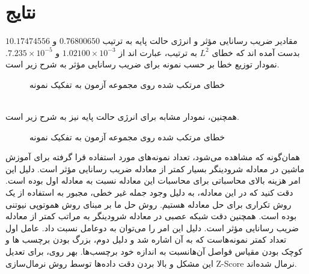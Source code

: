 \section*{نتایج}
مقادیر ضریب رسانایی مؤثر و انرژی حالت پایه به ترتیب $0.76800650$ و $10.17474556$ بدست آمده اند که خطای $L^2$ به ترتیب، عبارت اند از $1.02100 \times 10^{-3}$ و $7.235 \times 10^{-5}$. نمودار توزیع خطا بر حسب نمونه برای ضریب رسانایی مؤثر به شرح زیر است.
\begin{figure}[h!]
	{
		\centering
		\def\svgwidth{\columnwidth}
		\scalebox{.5}{}
		\caption{خطای مرتکب شده  روی مجموعه آزمون به تفکیک نمونه}
		\label{fig:ECIM_error_bar}
	}
\end{figure}
\\همچنین، نمودار مشابه برای انرژی حالت پایه نیز به شرح زیر است.
\begin{figure}[h!]
	{
		\centering
		\def\svgwidth{\columnwidth}
		\scalebox{.5}{}
		\caption{خطای مرتکب شده  روی مجموعه آزمون به تفکیک نمونه}
		\label{fig:NLSE_error_bar}
	}
\end{figure}
همان‌گونه که مشاهده می‌شود، تعداد نمونه‌های مورد استفاده قرا گرفته برای آموزش ماشین در معادله شرودینگر بسیار کمتر از معادله ضریب رسانایی مؤثر است. دلیل این امر هزینه بالای محاسباتی برای محاسبات این معادله نسبت به معادله اول بوده است. دقت کنید که در این معادله، به دلیل وجود جمله غیر خطی، مجبور به استفاده از یک روش تکراری برای حل معادله هستیم. روش حل ما بر مبنای روش هموتوپی نیوتنی بوده است. همچنین دقت شبکه عصبی در معادله شرودینگر به مراتب کمتر از معادله ضریب رسانایی مؤثر است. دلیل این امر را می‌توان به دوعامل نسبت داد. عامل اول تعداد کمتر نمونه‌هاست که به آن اشاره شد و دلیل دوم، بزرگ بودن برچسب ها و کوچک بودن مقیاس فواصل آن‌هانسبت به اندازه خود برچسب‌ها. بهر روی، برای تعدیل این مشکل و بالا بردن دقت داده‌ها توسط روش نرمال‌سازی Z-Score نرمال شده‌اند.
\clearpage
\newpage
